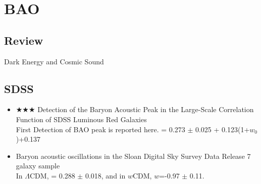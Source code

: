 \section{BAO}
\subsection{Review}
Dark Energy and Cosmic Sound \citep[][eisenstein05b, \#15 4/21/10]{eisenstein05b}

\subsection{SDSS}
\begin{itemize}
\item $\bigstar\bigstar\bigstar$
Detection of the Baryon Acoustic Peak in the Large-Scale Correlation Function of SDSS Luminous Red Galaxies
\citep[][eisenstein05a, \#1054 4/21/10]{eisenstein05a}\\
First Detection of BAO peak is reported here.
\omegam = 0.273 $\pm$ 0.025 + 0.123(1+$w_{0}$)+0.137 \omegak

\item Baryon acoustic oscillations in the Sloan Digital Sky Survey Data 
Release 7 galaxy sample
\citep[][percival10a]{percival10a}\\
In $\Lambda$CDM,
\omegam = 0.288 $\pm$ 0.018, and in $w$CDM, 
$w$=-0.97 $\pm$ 0.11.

\end{itemize}

